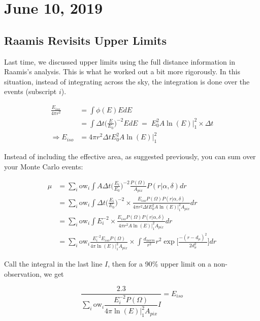 \chapter{June 10, 2019}

\section{Raamis Revisits Upper Limits}
Last time, we discussed upper limits using the full distance information in Raamis's analysis. This is what he worked out a bit more rigorously. In this situation, instead of integrating across the sky, the integration is done over the events (subscript $i$).

\begin{align*}
    \frac{E_{iso}}{4\pi r^2} &= \int \phi(E)E dE \\
    &= \int \Delta t \Big(\frac{E}{E_0}\Big)^{-2}EdE \; = \; E_0^2A\ln (E)|^2_1 \times \Delta t \\
    \Rightarrow E_{iso} &= 4 \pi r^2 \Delta t E_0^2 A \ln (E)|^2_1
\end{align*}

Instead of including the effective area, as suggested previously, you can sum over your Monte Carlo events:

\begin{align*}
    \mu &= \sum_i \text{ow}_i \int A \Delta t \Big(\frac{E_i}{E_0}\Big)^{-2} \frac{P(\Omega)}{A_{pix}}P(r|\alpha, \delta) dr\\
    &= \sum_i \text{ow}_i \int \Delta t \Big(\frac{E_i}{E_0}\Big)^{-2} \times \frac{E_{iso}P(\Omega)P(r|\alpha, \delta)}{4\pi r^2 \Delta t E_0^2 A \ln (E)|^2_1 A_{pix}} dr \\ 
    &= \sum_i \text{ow}_i \int E_i^{-2} \times \frac{E_{iso}P(\Omega)P(r|\alpha, \delta)}{4\pi r^2 A \ln (E)|^2_1 A_{pix}} dr \\
    &= \sum_i \text{ow}_i \frac{E_i^{-2}E_{iso}P(\Omega)}{4\pi \ln(E)|^2_1 A_{pix}} \times \int \frac{d_{norm}}{r^2}r^2 \exp\Big[ \frac{-(r-d_{\mu})^2}{2 d_{\sigma}^2} \Big] dr
\end{align*}

Call the integral in the last line $I$, then for a 90\% upper limit on a non-observation, we get

\begin{equation}
    \label{eq:GW_upper_limit}
    \dfrac{2.3}{\sum_i \text{ow}_i \dfrac{E_i^{-2}P(\Omega)}{4\pi \ln(E)|^2_1 A_{pix}}I} = E_{iso}
\end{equation}